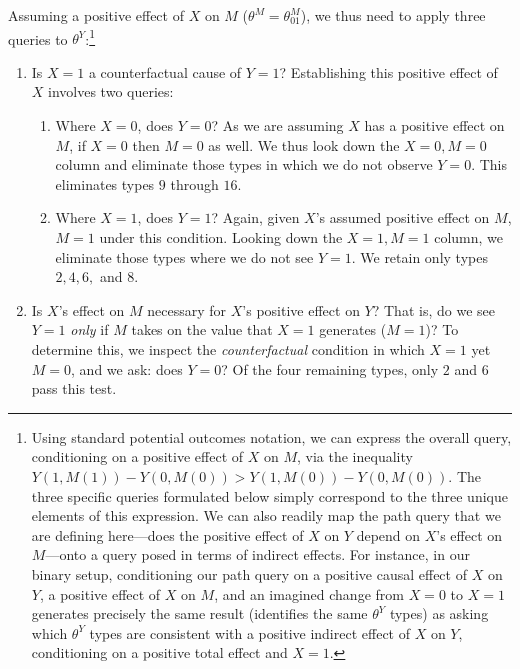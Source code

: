 \documentclass[
  12pt,
]{book}
\begin{document}
Assuming a positive effect of \(X\) on \(M\) (\(\theta^M=\theta^M_{01}\)), we thus need to apply three queries to \(\theta^Y\):\footnote{Using standard potential outcomes notation, we can express the overall query, conditioning on a positive effect of \(X\) on \(M\), via the inequality \(Y(1, M(1)) - Y(0, M(0)) > Y(1, M(0)) - Y(0, M(0))\). The three specific queries formulated below simply correspond to the three unique elements of this expression. We can also readily map the path query that we are defining here---does the positive effect of \(X\) on \(Y\) depend on \(X\)'s effect on \(M\)---onto a query posed in terms of indirect effects. For instance, in our binary setup, conditioning our path query on a positive causal effect of \(X\) on \(Y\), a positive effect of \(X\) on \(M\), and an imagined change from \(X=0\) to \(X=1\) generates precisely the same result (identifies the same \(\theta^Y\) types) as asking which \(\theta^Y\) types are consistent with a positive indirect effect of \(X\) on \(Y\), conditioning on a positive total effect and \(X=1\).}

\begin{enumerate}
\def\labelenumi{\arabic{enumi}.}
\item
  Is \(X=1\) a counterfactual cause of \(Y=1\)? Establishing this positive effect of \(X\) involves two queries:

  \begin{enumerate}
  \def\labelenumii{\alph{enumii})}
  \item
    Where \(X=0\), does \(Y=0\)? As we are assuming \(X\) has a positive effect on \(M\), if \(X=0\) then \(M=0\) as well. We thus look down the \(X=0, M=0\) column and eliminate those types in which we do not observe \(Y=0\). This eliminates types \(9\) through \(16\).
  \item
    Where \(X=1\), does \(Y=1\)? Again, given \(X\)'s assumed positive effect on \(M\), \(M=1\) under this condition. Looking down the \(X=1, M=1\) column, we eliminate those types where we do not see \(Y=1\). We retain only types \(2, 4, 6,\) and \(8\).
  \end{enumerate}
\item
  Is \(X\)'s effect on \(M\) necessary for \(X\)'s positive effect on \(Y\)? That is, do we see \(Y=1\) \emph{only} if \(M\) takes on the value that \(X=1\) generates (\(M=1\))? To determine this, we inspect the \emph{counterfactual} condition in which \(X=1\) yet \(M=0\), and we ask: does \(Y=0\)? Of the four remaining types, only \(2\) and \(6\) pass this test.
\end{enumerate}
\end{document}
